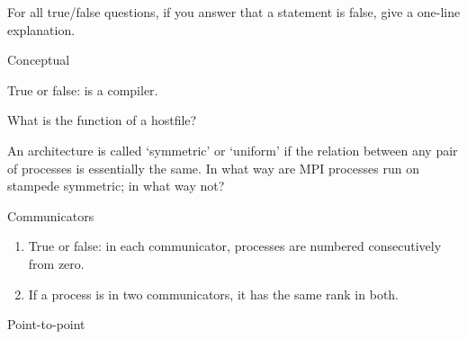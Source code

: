 
For all true/false questions, if you answer that a statement is false, give a one-line explanation.

 {Conceptual}

\begin{exercise}
  \label{ex:m1}
  True or false:  is a compiler.
\end{exercise}

\begin{exercise}
  What is the function of a hostfile?
\end{exercise}

\begin{pcse}
\begin{exercise}
    An architecture is called `symmetric' or `uniform' if the
    relation between any pair of processes is essentially the same.
    In what way are MPI processes run on stampede symmetric; in what way
    not?
\end{exercise}
\end{pcse}

 {Communicators}

\begin{enumerate}

\item True or false: in each communicator, processes are numbered consecutively from zero.
\item If a process is in two communicators, it has the same rank in
both.

\end{enumerate}

 {Point-to-point}

